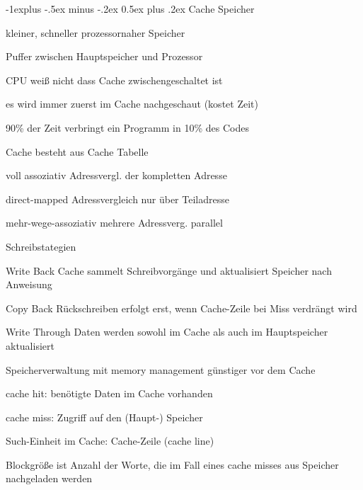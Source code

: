 \documentclass[a4paper]{article}
\makeatletter
\renewcommand{\subsection}{\@startsection{subsection}{2}{0mm}%
                                {-1explus -.5ex minus -.2ex}%
                                {0.5ex plus .2ex}%
                                {\normalfont\normalsize\bfseries}}
\makeatother
\begin{document}
\begin{multicols}{3}
  \subsection{Cache Speicher}
  \begin{itemize*}
    \item kleiner, schneller prozessornaher Speicher
    \item Puffer zwischen Hauptspeicher und Prozessor
    \item CPU weiß nicht dass Cache zwischengeschaltet ist
    \item es wird immer zuerst im Cache nachgeschaut (kostet Zeit)
    \item 90\% der Zeit verbringt ein Programm in 10\% des Codes
    \item Cache besteht aus Cache Tabelle
    \begin{description*}
      \item[voll assoziativ] Adressvergl. der kompletten Adresse
      \item[direct-mapped] Adressvergleich nur über Teiladresse
      \item[mehr-wege-assoziativ] mehrere Adressverg. parallel
    \end{description*}
    \item Schreibstategien
    \begin{description*}
      \item[Write Back] Cache sammelt Schreibvorgänge und aktualisiert Speicher nach Anweisung
      \item[Copy Back] Rückschreiben erfolgt erst, wenn Cache-Zeile bei Miss verdrängt wird
      \item[Write Through] Daten werden sowohl im Cache als auch im Hauptspeicher aktualisiert
    \end{description*}
    \item Speicherverwaltung mit memory management günstiger vor dem Cache
    \item cache hit: benötigte Daten im Cache vorhanden
    \item cache miss: Zugriff auf den (Haupt-) Speicher
    \item Such-Einheit im Cache: Cache-Zeile (cache line)
    \item Blockgröße ist Anzahl der Worte, die im Fall eines cache misses aus Speicher nachgeladen werden

\end{itemize*}
\end{multicols}
\end{document}
